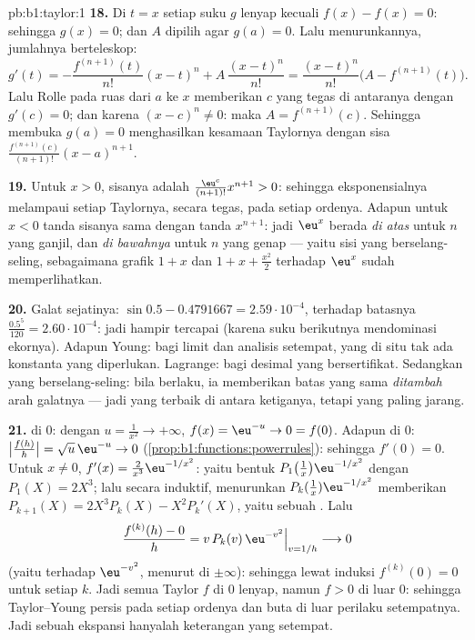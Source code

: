 \begin{solution}{pb:b1:taylor:1}
\textbf{18.} Di $t = x$ setiap suku $g$ lenyap kecuali $f(x)
- f(x) = 0$: sehingga $g(x) = 0$; dan $A$ dipilih agar $g(a) = 0$.
Lalu menurunkannya, jumlahnya berteleskop:
\[
g'(t) = -\frac{f^{(n+1)}(t)}{n!}(x - t)^n +
A\,\frac{(x-t)^n}{n!}
= \frac{(x-t)^n}{n!}\bigl(A - f^{(n+1)}(t)\bigr) .
\]
Lalu Rolle pada ruas dari $a$ ke $x$ memberikan $c$ yang tegas di antaranya
dengan $g'(c) = 0$; dan karena $(x - c)^n \neq 0$: maka $A =
f^{(n+1)}(c)$. Sehingga membuka $g(a) = 0$ menghasilkan kesamaan Taylornya
dengan sisa $\frac{f^{(n+1)}(c)}{(n+1)!}(x-a)^{n+1}$.

\textbf{19.} Untuk $x > 0$, sisanya adalah $\frac{\eu^{c}}
{(n+1)!}x^{n+1} > 0$: sehingga eksponensialnya melampaui setiap
 Taylornya, secara tegas, pada setiap ordenya. Adapun untuk $x < 0$
tanda sisanya sama dengan tanda $x^{n+1}$: jadi $\eu^x$ berada
\emph{di atas}  untuk $n$ yang ganjil, dan \emph{di bawahnya} untuk
$n$ yang genap --- yaitu sisi yang berselang-seling, sebagaimana grafik $1 + x$ dan $1
+ x + \frac{x^2}{2}$ terhadap $\eu^x$ sudah memperlihatkan.

\textbf{20.} Galat sejatinya: $\sin 0.5 - 0.4791667 =
2.59\cdot10^{-4}$, terhadap batasnya $\frac{0.5^5}{120} =
2.60\cdot10^{-4}$: jadi hampir tercapai (karena suku berikutnya mendominasi
ekornya). Adapun Young: bagi limit dan analisis setempat, yang di situ tak ada konstanta
yang diperlukan. Lagrange: bagi desimal yang bersertifikat. Sedangkan yang berselang-seling: bila
berlaku, ia memberikan batas yang sama \emph{ditambah} arah galatnya
--- jadi yang terbaik di antara ketiganya, tetapi yang paling jarang.

\textbf{21.}  di $0$: dengan $u = \frac{1}{x^2} \to
+\infty$, $f(x) = \eu^{-u} \to 0 = f(0)$. Adapun  di $0$:
$\bigl|\frac{f(h)}{h}\bigr| = \sqrt u\,\eu^{-u} \to 0$
(\cref{prop:b1:functions:powerrules}): sehingga $f'(0) = 0$. Untuk $x \neq
0$, $f'(x) = \frac{2}{x^3}\eu^{-1/x^2}$: yaitu bentuk
$P_1\bigl(\frac1x\bigr)\eu^{-1/x^2}$ dengan $P_1(X) = 2X^3$;
lalu secara induktif, menurunkan $P_k(\frac1x)\eu^{-1/x^2}$ memberikan
$P_{k+1}(X) = 2X^3 P_k(X) - X^2 P_k'(X)$, yaitu sebuah . Lalu
\[
\frac{f^{(k)}(h) - 0}{h} = v\,P_k(v)\,\eu^{-v^2}
\Big|_{v = 1/h} \longrightarrow 0
\]
(yaitu  terhadap $\eu^{-v^2}$, menurut  di
$\pm\infty$): sehingga lewat induksi $f^{(k)}(0) = 0$ untuk setiap $k$. Jadi semua
 Taylor $f$ di $0$ lenyap, namun $f > 0$ di luar $0$:
sehingga Taylor--Young persis pada setiap ordenya dan buta di luar
perilaku setempatnya. Jadi sebuah ekspansi hanyalah keterangan yang setempat.


\end{solution}
